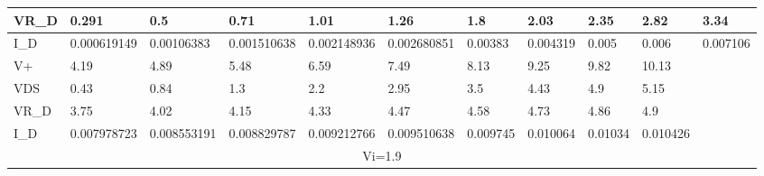 \begin{table}[h]
{\begin{tabular}{|lllllllllll|}
\multicolumn{1}{|l|}{VR\_D} & \multicolumn{1}{l|}{0.291}       & \multicolumn{1}{l|}{0.5}         & \multicolumn{1}{l|}{0.71}        & \multicolumn{1}{l|}{1.01}        & \multicolumn{1}{l|}{1.26}        & \multicolumn{1}{l|}{1.8}      & \multicolumn{1}{l|}{2.03}     & \multicolumn{1}{l|}{2.35}     & \multicolumn{1}{l|}{2.82}     & 3.34     \\ \hline
\multicolumn{1}{|l|}{I\_D}  & \multicolumn{1}{l|}{0.000619149} & \multicolumn{1}{l|}{0.00106383}  & \multicolumn{1}{l|}{0.001510638} & \multicolumn{1}{l|}{0.002148936} & \multicolumn{1}{l|}{0.002680851} & \multicolumn{1}{l|}{0.00383}  & \multicolumn{1}{l|}{0.004319} & \multicolumn{1}{l|}{0.005}    & \multicolumn{1}{l|}{0.006}    & 0.007106 \\ \hline
\multicolumn{1}{|l|}{V+}    & \multicolumn{1}{l|}{4.19}        & \multicolumn{1}{l|}{4.89}        & \multicolumn{1}{l|}{5.48}        & \multicolumn{1}{l|}{6.59}        & \multicolumn{1}{l|}{7.49}        & \multicolumn{1}{l|}{8.13}     & \multicolumn{1}{l|}{9.25}     & \multicolumn{1}{l|}{9.82}     & \multicolumn{1}{l|}{10.13}    &          \\ \hline
\multicolumn{1}{|l|}{VDS}   & \multicolumn{1}{l|}{0.43}        & \multicolumn{1}{l|}{0.84}        & \multicolumn{1}{l|}{1.3}         & \multicolumn{1}{l|}{2.2}         & \multicolumn{1}{l|}{2.95}        & \multicolumn{1}{l|}{3.5}      & \multicolumn{1}{l|}{4.43}     & \multicolumn{1}{l|}{4.9}      & \multicolumn{1}{l|}{5.15}     &          \\ \hline
\multicolumn{1}{|l|}{VR\_D} & \multicolumn{1}{l|}{3.75}        & \multicolumn{1}{l|}{4.02}        & \multicolumn{1}{l|}{4.15}        & \multicolumn{1}{l|}{4.33}        & \multicolumn{1}{l|}{4.47}        & \multicolumn{1}{l|}{4.58}     & \multicolumn{1}{l|}{4.73}     & \multicolumn{1}{l|}{4.86}     & \multicolumn{1}{l|}{4.9}      &          \\ \hline
\multicolumn{1}{|l|}{I\_D}  & \multicolumn{1}{l|}{0.007978723} & \multicolumn{1}{l|}{0.008553191} & \multicolumn{1}{l|}{0.008829787} & \multicolumn{1}{l|}{0.009212766} & \multicolumn{1}{l|}{0.009510638} & \multicolumn{1}{l|}{0.009745} & \multicolumn{1}{l|}{0.010064} & \multicolumn{1}{l|}{0.01034}  & \multicolumn{1}{l|}{0.010426} &          \\ \hline
\multicolumn{11}{|c|}{Vi=1.9}                                                                                                                                                                                                                                                                                                                         \\ \hline

\end{tabular}}
\end{table}
